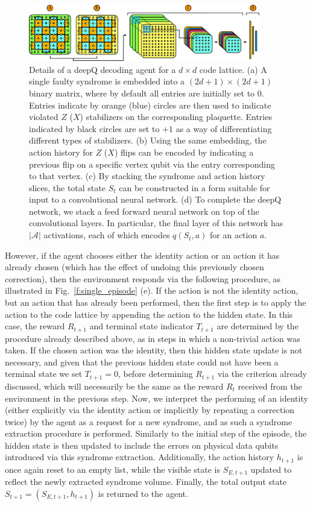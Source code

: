 \documentclass[twocolumn,preprintnumbers,amsmath,amssymb,notitlepage,nofootinbib,longbibliography,superscriptaddress,aps,pra,10pt]{revtex4-1}
\begin{document}
	\begin{figure}
		\centering
		\includegraphics[width=0.9\textwidth]{figures/agent.pdf}
		\caption{
			Details of a deepQ decoding agent for a $d\times d$ code lattice.
			(a) A single faulty syndrome is embedded into a $(2d +1)\times(2d+1)$ binary matrix, where by default all entries are initially set to $0$.
			Entries indicate by orange (blue) circles are then used to indicate violated $Z$ ($X$) stabilizers on the corresponding plaquette.
			Entries indicated by black circles are set to $+1$ as a way of differentiating different types of stabilizers.
			(b) Using the same embedding, the action history for $Z$ ($X$) flips can be encoded by indicating a previous flip on a specific vertex qubit via the entry corresponding to that vertex.
			(c) By stacking the syndrome and action history slices, the total state $S_t$ can be constructed in a form suitable for input to a convolutional neural network.
			(d) To complete the deepQ network, we stack a feed forward neural network on top of the convolutional layers.
			In particular, the final layer of this network has $|\mathcal{A}|$ activations, each of which encodes $q(S_t,a)$ for an action $a$.
		}
		\label{f:agent}
	\end{figure}

	However, if the agent chooses either the identity action or an action it has already chosen (which has the effect of undoing this previously chosen correction), then the environment responds via the following procedure, as illustrated in Fig.~\ref{f:single_episode} (e).
	If the action is not the identity action, but an action that has already been performed, then the first step is to apply the action to the code lattice by appending the action to the hidden state.
	In this case, the reward $R_{t+1}$ and terminal state indicator $T_{t+1}$ are determined by the procedure already described above, as in steps in which a non-trivial action was taken.
	If the chosen action was the identity, then this hidden state update is not necessary, and given that the previous hidden state could not have been a terminal state we set $T_{t+1} = 0$, before determining $R_{t+1}$ via the criterion already discussed, which will necessarily be the same as the reward $R_t$ received from the environment in the previous step.
	Now, we interpret the performing of an identity (either explicitly via the identity action or implicitly by repeating a correction twice) by the agent as a request for a new syndrome, and as such a syndrome extraction procedure is performed.
	Similarly to the initial step of the episode, the hidden state is then updated to include the errors on physical data qubits introduced via this syndrome extraction.
	Additionally, the action history $h_{t+1}$ is once again reset to an empty list, while the visible state is $S_{E,t+1}$ updated to reflect the newly extracted syndrome volume.
	Finally, the total output state $S_{t+1} = (S_{E,t+1},h_{t+1})$ is returned to the agent.
\end{document}
